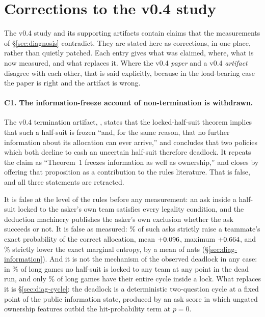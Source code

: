 \section{Corrections to the v0.4 study}
\label{sec:corrections}

The v0.4 study \cite{fishbot04} and its supporting artifacts contain claims that
the measurements of \S\ref{sec:diagnosis} contradict. They are stated here as
corrections, in one place, rather than quietly patched. Each entry gives what was
claimed, where, what is now measured, and what replaces it. Where the v0.4
\emph{paper} and a v0.4 \emph{artifact} disagree with each other, that is said
explicitly, because in the load-bearing case the paper is right and the artifact
is wrong.

\paragraph{C1. The information-freeze account of non-termination is withdrawn.}
The v0.4 termination artifact, ,
states that the locked-half-suit theorem implies that such a half-suit is frozen
``and, for the same reason, that no further information about its allocation can
ever arrive,'' and concludes that two policies which both decline to cash an
uncertain half-suit therefore deadlock. It repeats the claim as ``Theorem~1
freezes information as well as ownership,'' and closes by offering that
proposition as a contribution to the rules literature. That is false, and all
three statements are retracted.

It is false at the level of the rules before any measurement: an ask inside a
half-suit locked to the asker's own team satisfies every legality condition, and
the deduction machinery publishes the asker's own exclusion whether the ask
succeeds or not. It is false as measured: \numCertRate\% of such asks strictly
raise a teammate's exact probability of the correct allocation, mean
$+0.096$, maximum $+0.664$, and \numEntropyRate\% strictly lower the
exact marginal entropy, by a mean of \numEntropyMean{} nats
(\S\ref{sec:diag-information}). And it is not the mechanism of the observed
deadlock in any case: in \numNoLockPct\% of long games no half-suit is locked to
any team at any point in the dead run, and only \numCycleInLock\% of long games
have their entire cycle inside a lock. What replaces it is
\S\ref{sec:diag-cycle}: the deadlock is a deterministic two-question cycle at a
fixed point of the public information state, produced by an ask score in which
ungated ownership features outbid the hit-probability term at $p = 0$.

